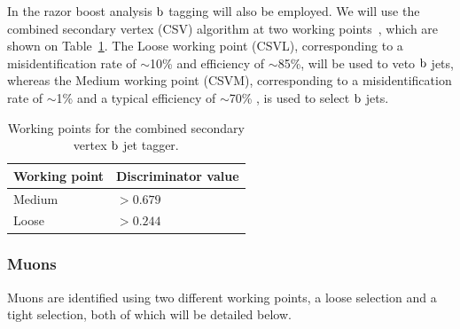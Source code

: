 In the razor boost analysis $\mathrm{b}$ tagging will also be employed. We will use the combined
secondary vertex (CSV) algorithm at two working points~\cite{btag7TeV,btag8TeV,BTagWP}, which are
shown on Table~\ref{tab:object_btag}. 
The Loose working point (CSVL), corresponding to a misidentification rate of $\sim$10\% and
efficiency of $\sim$85\%, will be used to veto $\mathrm{b}$ jets, whereas the Medium working point
(CSVM), corresponding to a misidentification rate of $\sim$1\% and a typical efficiency of
$\sim$70\% , is used to select $\mathrm{b}$ jets. 

\begin{table}[htdp]
\caption{Working points for the combined secondary vertex $\mathrm{b}$ jet tagger.
\label{tab:object_btag}}
\begin{center}
\begin{tabular}{l l}
\toprule
Working point & Discriminator value \\
\midrule
Medium & $> 0.679$ \\
Loose & $> 0.244$ \\
\bottomrule
\end{tabular}
\end{center}
\end{table}
% 


\subsubsection{Muons \label{sec:object_muon}}

Muons are identified using two different working points, a loose selection and a tight selection,
both of which will be detailed below. 



